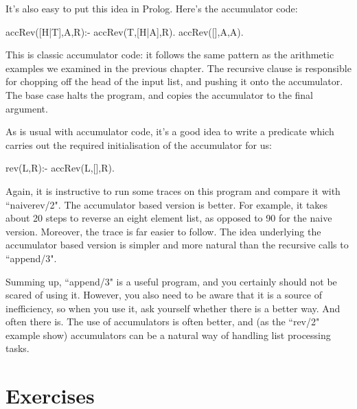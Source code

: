 It's also easy to put this idea in Prolog.  Here's the accumulator
code:
\begin{LPNcodedisplay}
accRev([H|T],A,R):- accRev(T,[H|A],R).
accRev([],A,A).
\end{LPNcodedisplay}
This is classic accumulator code: it follows the same pattern
as the arithmetic examples we examined in the previous chapter.  The
recursive clause is responsible for chopping off the head of the input
list, and pushing it onto the accumulator.  The base case halts the
program, and copies the accumulator to the final argument.

As is usual with accumulator code, it's a good idea to write a
predicate which carries out the required initialisation of the
accumulator for us:
\begin{LPNcodedisplay}
rev(L,R):- accRev(L,[],R).
\end{LPNcodedisplay}

Again, it is instructive to run some traces on this program and
compare it with ``naiverev/2".  The accumulator based version is
 better. For example, it takes about 20 steps to reverse
an eight element list, as opposed to 90 for the naive version.
Moreover, the trace is far easier to follow. The idea underlying the
accumulator based version is simpler and more natural than the
recursive calls to ``append/3".


Summing up, ``append/3" is a useful program, and you certainly should not
be scared of using it. However, you also need to be aware that it is a
source of inefficiency, so when you use it, ask yourself whether there
is a better way.  And often there is. The use of accumulators is often
better, and (as the ``rev/2" example show) accumulators can be a
natural way of handling list processing tasks.

\section{Exercises}\label{SEC.L6.EXERCISES}


